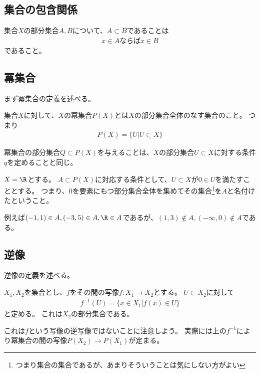 \documentclass[uplatex]{jsarticle}
\begin{document}
\subsection{集合の包含関係}
集合$X$の部分集合$A, B$について、$A\subset B$であることは
\begin{align*}
  x\in A\mbox{ならば}x\in B
\end{align*}
であること。

\subsection{冪集合}
まず冪集合の定義を述べる。
\begin{dfn}[冪集合]
  集合$X$に対して、$X$の冪集合$P(X)$とは$X$の部分集合全体のなす集合のこと。
  つまり
  \begin{align*}
    P(X)=\{U\vert U\subset X\}
  \end{align*}
\end{dfn}

冪集合の部分集合$Q\subset P(X)$を与えることは、$X$の部分集合$U\subset X$に対する条件$q$を定めることと同じ。

\begin{eg}
  $X=\R$とする。
  $A\subset P(X)$に対応する条件として、$U\subset X$が$0\in U$を満たすこととする。
  つまり、$0$を要素にもつ部分集合全体を集めてその集合\footnote{つまり集合の集合であるが、あまりそういうことは気にしない方がよい}を$A$と名付けたということ。

  例えば$(-1,1)\in A, (-3,5)\in A, \R\in A$であるが、$(1,3)\notin A, (-\infty,0)\notin A$である。
\end{eg}

\subsection{逆像}

逆像の定義を述べる。
\begin{dfn}[写像による部分集合の逆像]
  $X_1, X_2$を集合とし、$f$をその間の写像$f:X_1 \to X_2$とする。
  $U\subset X_2$に対して
  \begin{align*}
    f^{-1}(U)=\{x\in X_1\vert f(x)\in U\}
  \end{align*}
  と定める。
  これは$X_2$の部分集合である。
\end{dfn}
 
これは$f$という写像の逆写像ではないことに注意しよう。
実際には上の$f^{-1}$により冪集合の間の写像$P(X_2)\to P(X_1)$が定まる。




\end{document}
